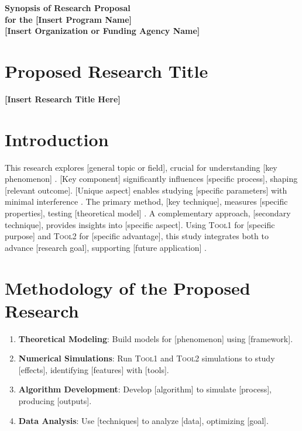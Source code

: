 \documentclass[a4paper,12pt]{article}
\newcommand{\gev}{\textsc{Tool1}\xspace}
\newcommand{\scr}{\textsc{Tool2}\xspace}
\begin{document}
\begin{center}
    \textbf{\large Synopsis of Research Proposal \\ for the [Insert Program Name]} \\
    \vspace{0.5cm}
    \textbf{[Insert Organization or Funding Agency Name]} \\
\end{center}

\section*{Proposed Research Title}
\begin{center}
    \textbf{[Insert Research Title Here]}
\end{center}

\section*{Introduction}
This research explores [general topic or field], crucial for understanding [key phenomenon] \cite{peebles1980,aghanim2020}. [Key component] significantly influences [specific process], shaping [relevant outcome]. [Unique aspect] enables studying [specific parameters] with minimal interference \cite{aghanim2020}. The primary method, [key technique], measures [specific properties], testing [theoretical model] \cite{adamek2016}. A complementary approach, [secondary technique], provides insights into [specific aspect]. Using \gev for [specific purpose] and \scr for [specific advantage], this study integrates both to advance [research goal], supporting [future application] \cite{eingorn2022}.

\section*{Methodology of the Proposed Research}
\begin{enumerate}[label=\alph*.]
    \item \textbf{Theoretical Modeling}: Build models for [phenomenon] using [framework].
    \item \textbf{Numerical Simulations}: Run \gev and \scr simulations to study [effects], identifying [features] with [tools].
    \item \textbf{Algorithm Development}: Develop [algorithm] to simulate [process], producing [outputs].
    \item \textbf{Data Analysis}: Use [techniques] to analyze [data], optimizing [goal].
\end{enumerate}
\end{document}
